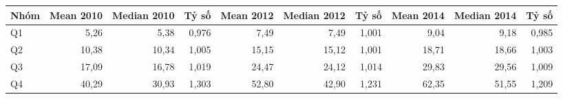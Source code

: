 \begin{tabular}{lrrrrrrrrr}
\toprule
Nhóm & Mean 2010 & Median 2010 & Tỷ số & Mean 2012 & Median 2012 & Tỷ số & Mean 2014 & Median 2014 & Tỷ số \\
\midrule
Q1 & 5,26 & 5,38 & 0,976 & 7,49 & 7,49 & 1,001 & 9,04 & 9,18 & 0,985 \\
Q2 & 10,38 & 10,34 & 1,005 & 15,15 & 15,12 & 1,001 & 18,71 & 18,66 & 1,003 \\
Q3 & 17,09 & 16,78 & 1,019 & 24,47 & 24,12 & 1,014 & 29,83 & 29,56 & 1,009 \\
Q4 & 40,29 & 30,93 & 1,303 & 52,80 & 42,90 & 1,231 & 62,35 & 51,55 & 1,209 \\
\bottomrule
\end{tabular}
